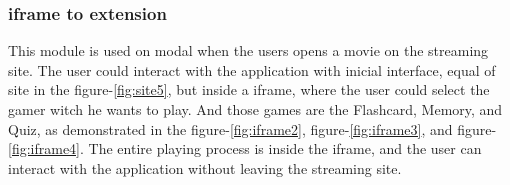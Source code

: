 \documentclass[12pt]{article}
\begin{document}



\newpage
\subsubsection{iframe to extension}
      This module is used on modal when the users opens a movie on the streaming site. The user could interact with the application with 
      inicial interface, equal of site in the figure-\ref{fig:site5}, but inside a iframe, where the user could select the gamer witch he wants to play. 
      And those games are the Flashcard, Memory, and Quiz, as demonstrated in the figure-\ref{fig:iframe2}, figure-\ref{fig:iframe3}, and figure-\ref{fig:iframe4}.
      The entire playing process is inside the iframe, and the user can interact with the application without leaving the streaming site.
      
      


\end{document}
